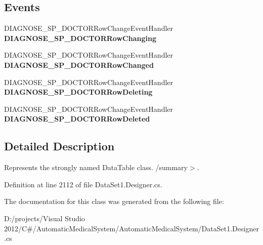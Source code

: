 \subsection*{Events}
\begin{CompactItemize}
\item 
DIAGNOSE\_\-SP\_\-DOCTORRowChangeEventHandler \textbf{DIAGNOSE\_\-SP\_\-DOCTORRowChanging}\label{class_automatic_medical_system_1_1_data_set1_1_1_d_i_a_g_n_o_s_e___s_p___d_o_c_t_o_r_data_table_b349b841846deebe06e1556c5361fbc2}

\item 
DIAGNOSE\_\-SP\_\-DOCTORRowChangeEventHandler \textbf{DIAGNOSE\_\-SP\_\-DOCTORRowChanged}\label{class_automatic_medical_system_1_1_data_set1_1_1_d_i_a_g_n_o_s_e___s_p___d_o_c_t_o_r_data_table_2e78e0f7fbe7a6e495c6c85eb81858ae}

\item 
DIAGNOSE\_\-SP\_\-DOCTORRowChangeEventHandler \textbf{DIAGNOSE\_\-SP\_\-DOCTORRowDeleting}\label{class_automatic_medical_system_1_1_data_set1_1_1_d_i_a_g_n_o_s_e___s_p___d_o_c_t_o_r_data_table_800986a3bc3320ccca262ca1a13f346d}

\item 
DIAGNOSE\_\-SP\_\-DOCTORRowChangeEventHandler \textbf{DIAGNOSE\_\-SP\_\-DOCTORRowDeleted}\label{class_automatic_medical_system_1_1_data_set1_1_1_d_i_a_g_n_o_s_e___s_p___d_o_c_t_o_r_data_table_16895c76691a8831544796659749a59d}

\end{CompactItemize}


\subsection{Detailed Description}
Represents the strongly named DataTable class. /summary$>$. 

Definition at line 2112 of file DataSet1.Designer.cs.

The documentation for this class was generated from the following file:\begin{CompactItemize}
\item 
D:/projects/Visual Studio 2012/C\#/AutomaticMedicalSystem/AutomaticMedicalSystem/DataSet1.Designer.cs\end{CompactItemize}
